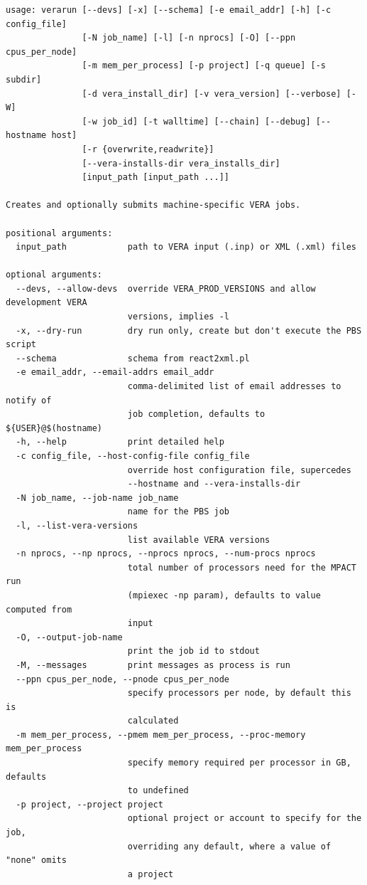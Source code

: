 \documentclass{vera-ornltm}
\begin{document}
\begin{verbatim}
usage: verarun [--devs] [-x] [--schema] [-e email_addr] [-h] [-c config_file]
               [-N job_name] [-l] [-n nprocs] [-O] [--ppn cpus_per_node]
               [-m mem_per_process] [-p project] [-q queue] [-s subdir]
               [-d vera_install_dir] [-v vera_version] [--verbose] [-W]
               [-w job_id] [-t walltime] [--chain] [--debug] [--hostname host]
               [-r {overwrite,readwrite}]
               [--vera-installs-dir vera_installs_dir]
               [input_path [input_path ...]]

Creates and optionally submits machine-specific VERA jobs.

positional arguments:
  input_path            path to VERA input (.inp) or XML (.xml) files

optional arguments:
  --devs, --allow-devs  override VERA_PROD_VERSIONS and allow development VERA
                        versions, implies -l
  -x, --dry-run         dry run only, create but don't execute the PBS script
  --schema              schema from react2xml.pl
  -e email_addr, --email-addrs email_addr
                        comma-delimited list of email addresses to notify of
                        job completion, defaults to ${USER}@$(hostname)
  -h, --help            print detailed help
  -c config_file, --host-config-file config_file
                        override host configuration file, supercedes
                        --hostname and --vera-installs-dir
  -N job_name, --job-name job_name
                        name for the PBS job
  -l, --list-vera-versions
                        list available VERA versions
  -n nprocs, --np nprocs, --nprocs nprocs, --num-procs nprocs
                        total number of processors need for the MPACT run
                        (mpiexec -np param), defaults to value computed from
                        input
  -O, --output-job-name
                        print the job id to stdout
  -M, --messages        print messages as process is run
  --ppn cpus_per_node, --pnode cpus_per_node
                        specify processors per node, by default this is
                        calculated
  -m mem_per_process, --pmem mem_per_process, --proc-memory mem_per_process
                        specify memory required per processor in GB, defaults
                        to undefined
  -p project, --project project
                        optional project or account to specify for the job,
                        overriding any default, where a value of "none" omits
                        a project

\end{verbatim}
\end{document}
